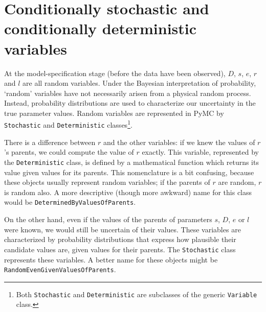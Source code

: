 \section*{Conditionally stochastic and conditionally deterministic variables}

At the model-specification stage (before the data have been observed), $D$, $s$, $e$, $r$ and $l$ are all random variables. Under the Bayesian interpretation of probability, `random' variables have not necessarily arisen from a physical random process. Instead, probability distributions are used to characterize our uncertainty in the true parameter values. Random variables are represented in PyMC by \texttt{Stochastic} and \texttt{Deterministic} classes\footnote{Both \texttt{Stochastic} and \texttt{Deterministic} are subclasses of the generic \texttt{Variable} class.}.

There is a difference between $r$ and the other variables: if we knew the values of $r$'s parents, we could compute the value of $r$ exactly. This variable, represented by the \texttt{Deterministic} class, is defined by a mathematical function which returns its value given values for its parents. This nomenclature is a bit confusing, because these objects usually represent random variables; if the parents of $r$ are random, $r$ is random also. A more descriptive (though more awkward) name for this class would be \texttt{DeterminedByValuesOfParents}.

On the other hand, even if the values of the parents of parameters $s$, $D$, $e$ or $l$ were known, we would still be uncertain of their values. These variables are characterized by probability distributions that express how plausible their candidate values are, given values for their parents. The \texttt{Stochastic} class represents these variables. A better name for these objects might be \texttt{RandomEvenGivenValuesOfParents}.

